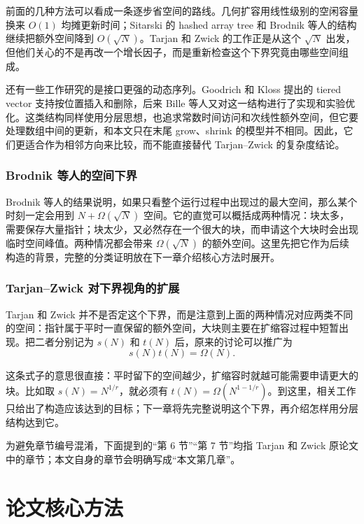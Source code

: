 \documentclass[12pt,a4paper]{article}
\begin{document}
前面的几种方法可以看成一条逐步省空间的路线。几何扩容用线性级别的空闲容量换来 $O(1)$ 均摊更新时间\cite{cormen2009introduction}；Sitarski 的 hashed array tree 和 Brodnik 等人的结构继续把额外空间降到 $O(\sqrt{N})$\cite{sitarski1996hats,brodnik1999resizable}。Tarjan 和 Zwick 的工作正是从这个 $\sqrt{N}$ 出发，但他们关心的不是再改一个增长因子，而是重新检查这个下界究竟由哪些空间组成\cite{tarjan2023optimalresizablearrays}。

还有一些工作研究的是接口更强的动态序列。Goodrich 和 Kloss 提出的 tiered vector 支持按位置插入和删除，后来 Bille 等人又对这一结构进行了实现和实验优化\cite{goodrich1999tieredvectors,bille2017fastdynamicarrays}。这类结构同样使用分层思想，也追求常数时间访问和次线性额外空间，但它要处理数组中间的更新，和本文只在末尾 grow、shrink 的模型并不相同。因此，它们更适合作为相邻方向来比较，而不能直接替代 Tarjan--Zwick 的复杂度结论。

\subsubsection{Brodnik 等人的空间下界}

Brodnik 等人的结果说明，如果只看整个运行过程中出现过的最大空间，那么某个时刻一定会用到 $N+\Omega(\sqrt{N})$ 空间\cite{brodnik1999resizable}。它的直觉可以概括成两种情况：块太多，需要保存大量指针；块太少，又必然存在一个很大的块，而申请这个大块时会出现临时空间峰值。两种情况都会带来 $\Omega(\sqrt{N})$ 的额外空间。这里先把它作为后续构造的背景，完整的分类证明放在下一章介绍核心方法时展开。

\subsubsection{Tarjan--Zwick 对下界视角的扩展}

Tarjan 和 Zwick 并不是否定这个下界，而是注意到上面的两种情况对应两类不同的空间：指针属于平时一直保留的额外空间，大块则主要在扩缩容过程中短暂出现。把二者分别记为 $s(N)$ 和 $t(N)$ 后，原来的讨论可以推广为
\[
    s(N)t(N)=\Omega(N).
\]

这条式子的意思很直接：平时留下的空间越少，扩缩容时就越可能需要申请更大的块。比如取 $s(N)=N^{1/r}$，就必须有 $t(N)=\Omega(N^{1-1/r})$。到这里，相关工作只给出了构造应该达到的目标；下一章将先完整说明这个下界，再介绍怎样用分层结构达到它。

为避免章节编号混淆，下面提到的“第 6 节”“第 7 节”均指 Tarjan 和 Zwick 原论文中的章节；本文自身的章节会明确写成“本文第几章”。


\section{论文核心方法}
\end{document}
